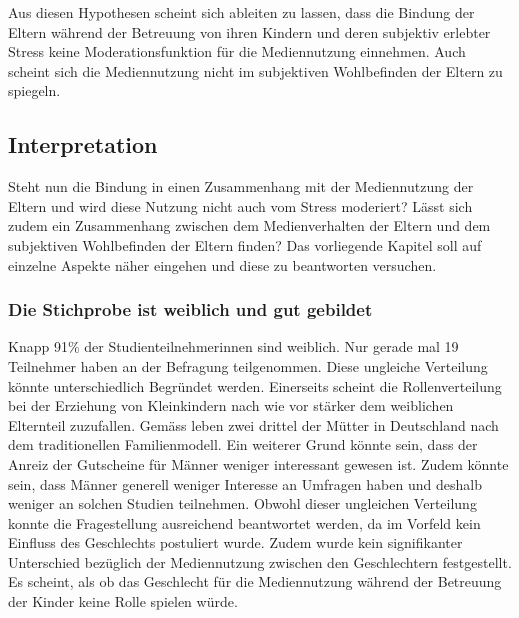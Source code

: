 Aus diesen Hypothesen scheint sich ableiten zu lassen, dass die Bindung der Eltern während der Betreuung von ihren Kindern und deren subjektiv erlebter Stress keine Moderationsfunktion für die Mediennutzung  einnehmen. Auch scheint sich die Mediennutzung nicht im subjektiven Wohlbefinden der Eltern zu spiegeln.

\subsection{Interpretation} \label{sec:Interpretation}
Steht nun die Bindung in einen Zusammenhang mit der Mediennutzung der Eltern und wird diese Nutzung nicht auch vom Stress moderiert? Lässt sich zudem ein Zusammenhang zwischen dem Medienverhalten der Eltern und dem subjektiven Wohlbefinden der Eltern finden? Das vorliegende Kapitel soll auf einzelne Aspekte näher eingehen und diese zu beantworten versuchen.

\subsubsection{Die Stichprobe ist weiblich und gut gebildet}
Knapp 91\% der Studienteilnehmerinnen sind weiblich. Nur gerade mal 19 Teilnehmer haben an der Befragung teilgenommen. Diese ungleiche Verteilung könnte unterschiedlich Begründet werden. Einerseits scheint die Rollenverteilung bei der Erziehung von Kleinkindern nach wie vor stärker dem weiblichen Elternteil zuzufallen. Gemäss  leben zwei drittel der Mütter in Deutschland nach dem traditionellen Familienmodell. Ein weiterer Grund könnte sein, dass der Anreiz der Gutscheine für Männer weniger interessant gewesen ist. Zudem könnte sein, dass Männer generell weniger Interesse an Umfragen haben und deshalb weniger an solchen Studien teilnehmen. Obwohl dieser ungleichen Verteilung konnte die Fragestellung ausreichend beantwortet werden, da im Vorfeld kein Einfluss des Geschlechts postuliert wurde. Zudem wurde kein signifikanter Unterschied bezüglich der Mediennutzung zwischen den Geschlechtern festgestellt. Es scheint, als ob das Geschlecht für die Mediennutzung während der Betreuung der Kinder keine Rolle spielen würde.


